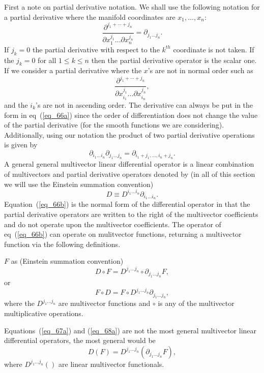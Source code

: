 \documentclass[12pt,twoside,openright]{memoir}
\newcommand{\bfrac}[2]{\displaystyle\frac{#1}{#2}}
\newcommand{\lp}{\left (}
\newcommand{\rp}{\right )}
\newcommand{\f}[2]{{#1}\lp {#2} \rp}
\newcommand{\be}{\begin{equation}}
\newcommand{\ee}{\end{equation}}
\begin{document}
First a note on partial derivative notation.  We shall use the following notation for a partial derivative where
the manifold coordinates are $x_{1},\dots,x_{n}$:
\be\label{eq_66a}
	\bfrac{\partial^{j_{1}+\cdots+j_{n}}}{\partial x_{1}^{j_{1}}\dots\partial x_{n}^{j_{n}}} = \partial_{j_{1}\dots j_{n}}.
\ee
If $j_{k}=0$ the partial derivative with respect to the $k^{th}$ coordinate is not taken.  If the $j_{k} = 0$ for all
$1 \le k \le n$ then the partial derivative operator is the scalar one.  If we consider a partial derivative where the $x$'s are
not in normal order such as
\begin{equation*}
	\bfrac{\partial^{j_{1}+\cdots+j_{n}}}{\partial x_{i_{1}}^{j_{1}}\dots\partial x_{i_{n}}^{j_{n}}}, 
\end{equation*}
and the $i_{k}$'s are not in ascending order.  The derivative can always be  put in the form in eq~(\ref{eq_66a}) since the order
of differentiation does not change the value of the partial derivative (for the smooth functions we are considering). 
Additionally, using our notation the product of two partial derivative operations is given by
\be
	\partial_{i_{1}\dots i_{n}}\partial_{j_{1}\dots j_{n}} = \partial_{i_{1}+j_{1},\dots, i_{n}+j_{n}}.
\ee 
A general general multivector linear differential operator is a linear combination of multivectors and partial derivative operators
denoted by (in all of this section we will use the Einstein summation convention) 
\be\label{eq_66b}
	D \equiv D^{i_{1}\dots i_{n}}\partial_{i_{1}\dots i_{n}}.
\ee
Equation~(\ref{eq_66b}) is the normal form of the differential operator in that the partial derivative operators are written to the right
of the multivector coefficients and do not operate upon the multivector coefficients.
The operator of eq~(\ref{eq_66b}) can operate on mulitvector functions, returning a multivector function via the following definitions.

$F$ as (Einstein summation convention)
\be\label{eq_67a}
	D\circ F = D^{j_{1}\dots j_{n}}\circ\partial_{j_{1}\dots j_{n}}F,
\ee
or
\be\label{eq_68a}
	F\circ D = F\circ D^{j_{1}\dots j_{n}}\partial_{j_{1}\dots j_{n}},
\ee
where the $D^{j_{1}\dots j_{n}}$ are multivector functions and $\circ$ is any of the multivector multiplicative operations.

Equations~(\ref{eq_67a}) and (\ref{eq_68a}) are not the most general multivector linear differential operators, the most general would be
\be
	\f{D}{F} = \f{D^{j_{1}\dots j_{n}}}{\partial_{j_{1}\dots j_{n}}F},
\ee
where $\f{D^{j_{1}\dots j_{n}}}{}$ are linear multivector functionals.
\end{document}
